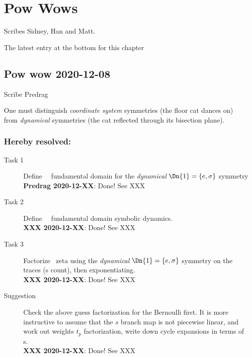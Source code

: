 
\renewcommand{\ssp}{\ensuremath{\phi}}             %
\renewcommand{\Ssym}[1]{{\ensuremath{m_{#1}}}}    %


\chapter{Pow Wows}
\label{chap:powwow}

\noindent
Scribes Sidney, Han and Matt.

\hfill   {\color{red} The latest entry at the bottom for this chapter}

\section{Pow wow 2020-12-08}
\label{sect:pw201208}

Scribe Predrag
\medskip

One must distinguish \emph{coordinate system} symmetries (the floor cat
dances on) from \emph{dynamical} symmetries (the cat reflected through
its bisection plane).

\subsection{Hereby resolved:}
\begin{description}
\item[Task 1]
Define \templatt\ \statesp\ fundamental domain for
the \emph{dynamical} $\Dn{1}=\{e,\sigma\}$ symmetry
\\
\textbf{Predrag 2020-12-XX}: Done! See XXX %

\item[Task 2]
Define \templatt\ \statesp\ fundamental domain symbolic dynamics.
\\
\textbf{XXX 2020-12-XX}: Done! See XXX

\item[Task 3]
Factorize \templatt\ zeta using the \emph{dynamical} $\Dn{1}=\{e,\sigma\}$
symmetry on the traces ({\lattstate}s count), then exponentiating.
\\
\textbf{XXX 2020-12-XX}: Done! See XXX

\item[Suggestion] Check the above guess factorization for the Bernoulli first.
It is more instructive to assume that the ${s}$ branch map is not
piecewise linear, and work out weights $t_p$ factorization, write
down cycle expansions in terms of {\orbit}s.
\\
\textbf{XXX 2020-12-XX}: Done! See XXX
\end{description}

